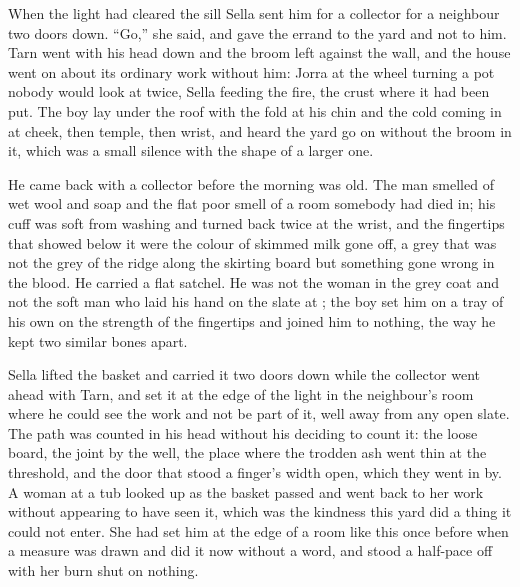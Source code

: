When the light had cleared the sill Sella sent him for a collector for a neighbour two doors down. “Go,” she said, and gave the errand to the yard and not to him. Tarn went with his head down and the broom left against the wall, and the house went on about its ordinary work without him: Jorra at the wheel turning a pot nobody would look at twice, Sella feeding the fire, the crust where it had been put. The boy lay under the roof with the fold at his chin and the cold coming in at cheek, then temple, then wrist, and heard the yard go on without the broom in it, which was a small silence with the shape of a larger one.

He came back with a collector before the morning was old. The man smelled of wet wool and soap and the flat poor smell of a room somebody had died in; his cuff was soft from washing and turned back twice at the wrist, and the fingertips that showed below it were the colour of skimmed milk gone off, a grey that was not the grey of the ridge along the skirting board but something gone wrong in the blood. He carried a flat satchel. He was not the woman in the grey coat and not the soft man who laid his hand on the slate at ; the boy set him on a tray of his own on the strength of the fingertips and joined him to nothing, the way he kept two similar bones apart.

Sella lifted the basket and carried it two doors down while the collector went ahead with Tarn, and set it at the edge of the light in the neighbour's room where he could see the work and not be part of it, well away from any open slate. The path was counted in his head without his deciding to count it: the loose board, the joint by the well, the place where the trodden ash went thin at the threshold, and the door that stood a finger's width open, which they went in by. A woman at a tub looked up as the basket passed and went back to her work without appearing to have seen it, which was the kindness this yard did a thing it could not enter. She had set him at the edge of a room like this once before when a measure was drawn and did it now without a word, and stood a half-pace off with her burn shut on nothing.

